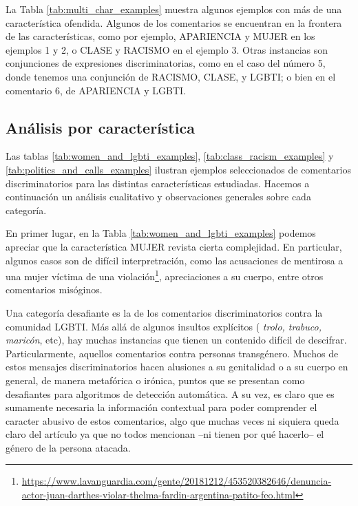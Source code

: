 La Tabla \ref{tab:multi_char_examples} muestra algunos ejemplos con más de una característica ofendida. Algunos de los comentarios se encuentran en la frontera de las características, como por ejemplo, APARIENCIA y MUJER en los ejemplos 1 y 2, o CLASE y RACISMO en el ejemplo 3. Otras instancias son conjunciones de expresiones discriminatorias, como en el caso del número 5, donde tenemos una conjunción de RACISMO, CLASE, y LGBTI; o bien en el comentario 6, de APARIENCIA y LGBTI.



\subsection{Análisis por característica}




Las tablas \ref{tab:women_and_lgbti_examples}, \ref{tab:class_racism_examples} y \ref{tab:politics_and_calls_examples} ilustran ejemplos seleccionados de comentarios discriminatorios para las distintas características estudiadas. Hacemos a continuación un análisis cualitativo y observaciones generales sobre cada categoría.

En primer lugar, en la Tabla \ref{tab:women_and_lgbti_examples} podemos apreciar que la característica MUJER revista cierta complejidad. En particular, algunos casos son de difícil interpretración, como las acusaciones de mentirosa a una mujer víctima de una violación\footnote{\url{https://www.lavanguardia.com/gente/20181212/453520382646/denuncia-actor-juan-darthes-violar-thelma-fardin-argentina-patito-feo.html}}, apreciaciones a su cuerpo, entre otros comentarios misóginos.

Una categoría desafiante es la de los comentarios discriminatorios contra la comunidad LGBTI. Más allá de algunos insultos explícitos ( \emph{trolo, trabuco, maricón}, etc), hay muchas instancias que tienen un contenido difícil de descifrar. Particularmente, aquellos comentarios contra personas transgénero. Muchos de estos mensajes discriminatorios hacen alusiones a su genitalidad o a su cuerpo en general, de manera metafórica o irónica, puntos que se presentan como desafiantes para algoritmos de detección automática. A su vez, es claro que es sumamente necesaria la información contextual para poder comprender el caracter abusivo de estos comentarios, algo que muchas veces ni siquiera queda claro del artículo ya que no todos mencionan --ni tienen por qué hacerlo-- el género de la persona atacada.

